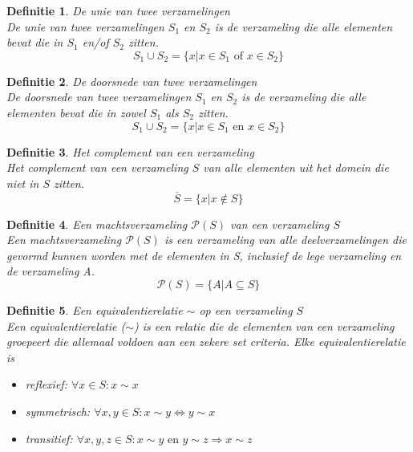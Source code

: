 \documentclass[a4paper]{article}
\newtheorem{tdefinitie}{Definitie}[section]
\newenvironment{definitie}[1]%
  {\begin{mdframed}[backgroundcolor=silver,
    topline=false,
    rightline=false,
    leftline=false,
    bottomline=false]\begin{tdefinitie}#1\\\normalfont}%
  {\end{tdefinitie}\end{mdframed}}
\newcommand{\powerset}{\ensuremath{\mathcal{P}}}
\newcommand{\en}{\ensuremath{\text{ en }}}
\newcommand{\of}{\ensuremath{\text{ of }}}
\begin{document}
\begin{definitie}{De unie van twee verzamelingen}
  De unie van twee verzamelingen $S_1$ en $S_2$ is de verzameling die alle elementen bevat die in $S_1$ en/of $S_2$ zitten.
  \begin{equation*}
  S_1 \cup S_2 = \{x|x \in S_1 \of x \in S_2\}
  \end{equation*}
\end{definitie}

\begin{definitie}{De doorsnede van twee verzamelingen}
  De doorsnede van twee verzamelingen $S_1$ en $S_2$ is de verzameling die alle elementen bevat die in zowel $S_1$ als $S_2$ zitten.
  \begin{equation*}
  S_1 \cup S_2 = \{x|x \in S_1 \en x \in S_2\}
  \end{equation*}
\end{definitie}

\begin{definitie}{Het complement van een verzameling}
  Het complement van een verzameling $S$ van alle elementen uit het domein die niet in $S$ zitten.
  \begin{equation*}
  \overline{S} = \{x|x \notin S\}
  \end{equation*}
\end{definitie}

\begin{definitie}{Een machtsverzameling $\powerset(S)$ van een verzameling $S$}
  Een machtsverzameling $\powerset(S)$ is een verzameling van alle deelverzamelingen die gevormd kunnen worden met de elementen in S, inclusief de lege verzameling en de verzameling A.
  \begin{equation*}
  \powerset(S) = \{A|A \subseteq S\}
  \end{equation*}
\end{definitie}

\begin{definitie}{Een equivalentierelatie $\sim$ op een verzameling $S$}
  Een equivalentierelatie ($\sim$) is een relatie die de elementen van een verzameling groepeert die allemaal voldoen aan een zekere set criteria. Elke equivalentierelatie is
  \begin{itemize}
  \item reflexief: $\forall x \in S: x \sim x$
  \item symmetrisch: $\forall x, y \in S: x \sim y \Leftrightarrow y \sim x$
  \item transitief: $\forall x, y, z \in S: x \sim y \en y \sim z \Rightarrow x \sim z$
  \end{itemize}
\end{definitie}
\end{document}
